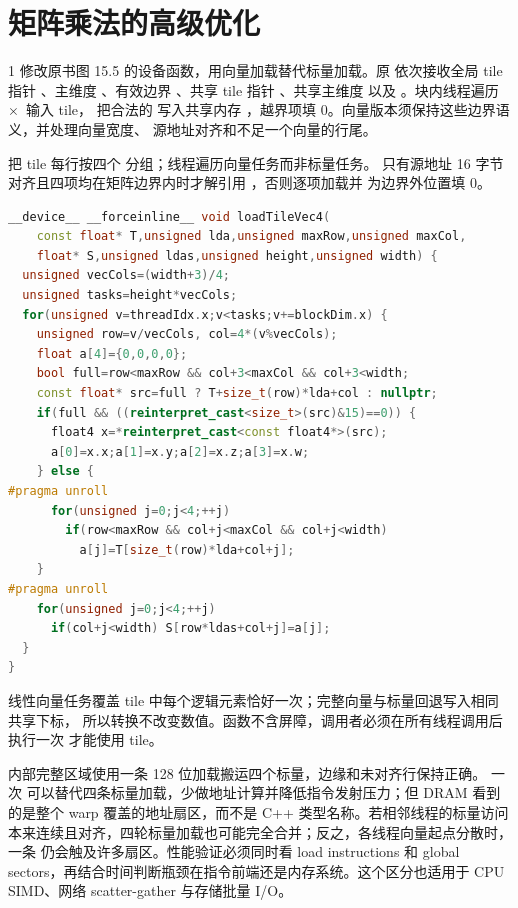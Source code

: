 \chapter{矩阵乘法的高级优化}

\begin{solutionexercise}{1}
\problemheading 修改原书图 15.5 的设备函数，用向量加载替代标量加载。原
 依次接收全局 tile 指针 、主维度 、有效边界
、共享 tile 指针 、共享主维度  以及
。块内线程遍历 \,$\times$\, 输入 tile，
把合法的
 写入共享内存
，越界项填 0。向量版本须保持这些边界语义，并处理向量宽度、
源地址对齐和不足一个向量的行尾。

\approachheading 把 tile 每行按四个  分组；线程遍历向量任务而非标量任务。
只有源地址 16 字节对齐且四项均在矩阵边界内时才解引用 ，否则逐项加载并
为边界外位置填 0。

\answerheading
\begin{lstlisting}[language=C++]
__device__ __forceinline__ void loadTileVec4(
    const float* T,unsigned lda,unsigned maxRow,unsigned maxCol,
    float* S,unsigned ldas,unsigned height,unsigned width) {
  unsigned vecCols=(width+3)/4;
  unsigned tasks=height*vecCols;
  for(unsigned v=threadIdx.x;v<tasks;v+=blockDim.x) {
    unsigned row=v/vecCols, col=4*(v%vecCols);
    float a[4]={0,0,0,0};
    bool full=row<maxRow && col+3<maxCol && col+3<width;
    const float* src=full ? T+size_t(row)*lda+col : nullptr;
    if(full && ((reinterpret_cast<size_t>(src)&15)==0)) {
      float4 x=*reinterpret_cast<const float4*>(src);
      a[0]=x.x;a[1]=x.y;a[2]=x.z;a[3]=x.w;
    } else {
#pragma unroll
      for(unsigned j=0;j<4;++j)
        if(row<maxRow && col+j<maxCol && col+j<width)
          a[j]=T[size_t(row)*lda+col+j];
    }
#pragma unroll
    for(unsigned j=0;j<4;++j)
      if(col+j<width) S[row*ldas+col+j]=a[j];
  }
}
\end{lstlisting}
线性向量任务覆盖 tile 中每个逻辑元素恰好一次；完整向量与标量回退写入相同共享下标，
所以转换不改变数值。函数不含屏障，调用者必须在所有线程调用后执行一次
 才能使用 tile。

\conclusionheading 内部完整区域使用一条 128 位加载搬运四个标量，边缘和未对齐行保持正确。
\discussionheading
{}一次  可以替代四条标量加载，少做地址计算并降低指令发射压力；但 DRAM 看到的是整个 warp 覆盖的地址扇区，而不是 C++ 类型名称。若相邻线程的标量访问本来连续且对齐，四轮标量加载也可能完全合并；反之，各线程向量起点分散时，一条  仍会触及许多扇区。性能验证必须同时看 load instructions 和 global sectors，再结合时间判断瓶颈在指令前端还是内存系统。这个区分也适用于 CPU SIMD、网络 scatter-gather 与存储批量 I/O。


\end{solutionexercise}
